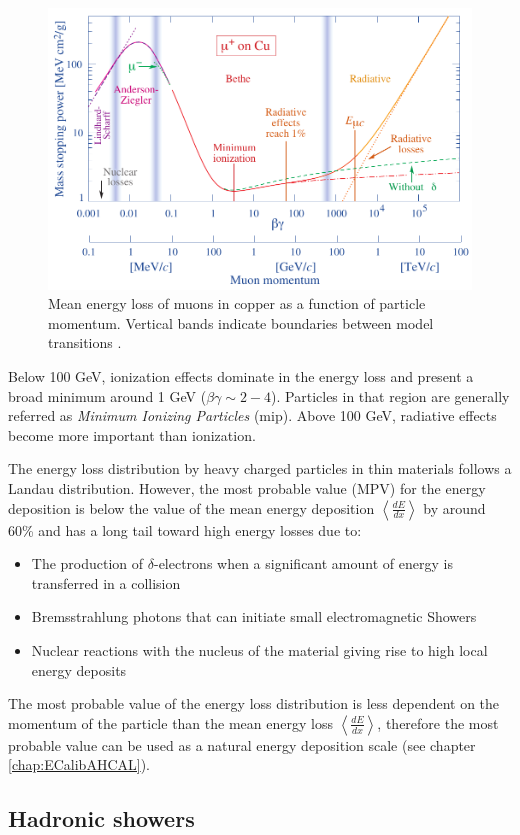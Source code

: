 \begin{figure}[htbp!]
  \centering
  \includegraphics[width=0.6\linewidth]{chap2/fig/rpp_icru49_cu_col.pdf}
  \caption{Mean energy loss of muons in copper as a function of particle momentum. Vertical bands indicate boundaries between model transitions \cite{Patrignani:2016xqp}.} \label{fig:BetheBloch}
\end{figure}

Below 100 GeV, ionization effects dominate in the energy loss and present a broad minimum around 1 GeV ($\beta\gamma \sim 2-4$). Particles in that region are generally referred as \textit{Minimum Ionizing Particles} (\acrshort{mip}). Above 100 GeV, radiative effects become more important than ionization.

The energy loss distribution by heavy charged particles in thin materials follows a Landau distribution. However, the most probable value (MPV) for the energy deposition is below the value of the mean energy deposition $\left<\frac{dE}{dx}\right>$ by around 60\% and has a long tail toward high energy losses due to:
\begin{itemize}
  \item The production of $\delta$-electrons when a significant amount of energy is transferred in a collision
  \item Bremsstrahlung photons that can initiate small electromagnetic Showers
  \item Nuclear reactions with the nucleus of the material giving rise to high local energy deposits
\end{itemize}
The most probable value of the energy loss distribution is less dependent on the momentum of the particle than the mean energy loss $\left<\frac{dE}{dx}\right>$, therefore the most probable value can be used as a natural energy deposition scale (see chapter \ref{chap:ECalibAHCAL}).

\subsection{Hadronic showers}
\label{subsec:HadShowers}

